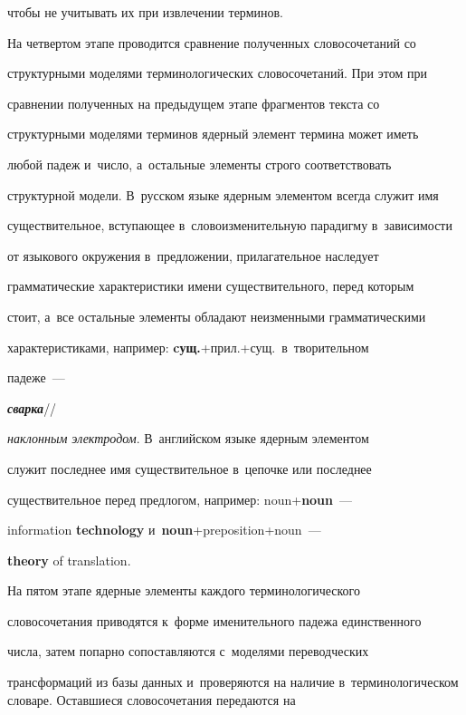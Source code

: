 чтобы не учитывать их при извлечении терминов.


     


     На четвертом этапе проводится сравнение полученных словосочетаний со 


структурными моделями терминологических словосочетаний. При этом при 


сравнении полученных на предыдущем этапе фрагментов текста со 


структурными моделями терминов ядерный элемент термина может иметь 


любой падеж и~число, а~остальные элементы строго соответствовать 


структурной модели. В~русском языке ядерным элементом всегда служит имя 


существительное, вступающее в~словоизменительную парадигму в~зависимости 


от языкового окружения в~предложении, прилагательное наследует 


грамматические характеристики имени существительного, перед которым 


стоит, а~все остальные элементы обладают неизменными грамматическими 


характеристиками, например: \textbf{cущ.}\;+\;прил.\;+\;сущ.\ в~творительном 


падеже~---  


{\bfseries\textit{свар\-ка}}\!/\!/ 


\textit{наклонным электродом}. В~английском языке ядерным элементом 


служит последнее имя существительное в~цепочке или последнее 


существительное перед предлогом, например: noun\;+\;\textbf{noun}~--- 


information \textbf{technology} и~\textbf{noun}\;+\;preposition\;+\;noun~--- 


\textbf{theory} of translation. 


     


     На пятом этапе ядерные элементы каждого терминологического 


словосочетания приводятся к~форме именительного падежа единственного 


числа, затем попарно сопоставляются с~моделями переводческих 


трансформаций из базы данных и~проверяются на наличие в~терминологическом словаре. Оставшиеся словосочетания передаются на 


